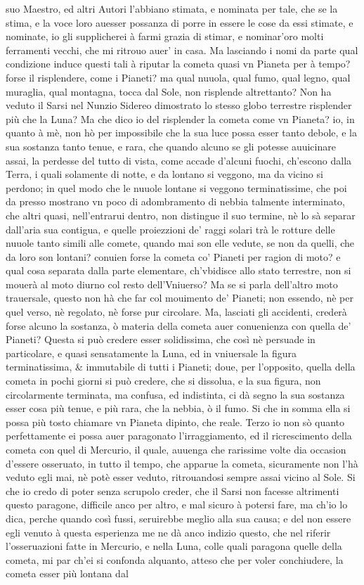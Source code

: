 \documentclass[11pt,twoside,openany]{book}
\begin{document}
suo Maestro, ed altri Autori l'abbiano stimata, e nominata per tale, che se la stima, e la voce loro auesser possanza di porre in essere le cose da essi stimate, e nominate, io gli supplicherei à farmi grazia di stimar, e nominar'oro molti ferramenti vecchi, che mi ritrouo auer' in casa. Ma lasciando i nomi da parte qual condizione induce questi tali à riputar la cometa quasi vn Pianeta per à tempo? forse il risplendere, come i Pianeti? ma qual nuuola, qual fumo, qual legno, qual muraglia, qual montagna, tocca dal Sole, non risplende altrettanto? Non ha veduto il Sarsi nel Nunzio Sidereo dimostrato lo stesso globo terrestre risplender più che la Luna? Ma che dico io del risplender la cometa come vn Pianeta? io, in quanto à mè, non hò per impossibile che la sua luce possa esser tanto debole, e la sua sostanza tanto tenue, e rara, che quando alcuno se gli potesse auuicinare assai, la perdesse del tutto di vista, come accade d'alcuni fuochi, ch'escono dalla Terra, i quali solamente di notte, e da lontano si veggono, ma da vicino si perdono; in quel modo che le nuuole lontane si veggono terminatissime, che poi da presso mostrano vn poco di adombramento di nebbia talmente interminato, che altri quasi, nell'entrarui dentro, non distingue il suo termine, nè lo sà separar dall'aria sua contigua, e quelle proiezzioni de' raggi solari trà le rotture delle nuuole tanto simili alle comete, quando mai son elle vedute, se non da quelli, che da loro son lontani? conuien forse la cometa co' Pianeti per ragion di moto? e qual cosa separata dalla parte elementare, ch'vbidisce allo stato terrestre, non si mouerà al moto diurno col resto dell'Vniuerso? Ma se si parla dell'altro moto trauersale, questo non hà che far col mouimento de' Pianeti; non essendo, nè per quel verso, nè regolato, nè forse pur circolare. Ma, lasciati gli accidenti, crederà forse alcuno la sostanza, ò materia della cometa auer conuenienza con quella de' Pianeti? Questa si può credere esser solidissima, che così nè persuade in particolare, e quasi sensatamente la Luna, ed in vniuersale la figura terminatissima, \& immutabile di tutti i Pianeti; doue, per l'opposito, quella della cometa in pochi giorni si può credere, che si dissolua, e la sua figura, non circolarmente terminata, ma confusa, ed indistinta, ci dà segno la sua sostanza esser cosa più tenue, e più rara, che la nebbia, ò il fumo. Si che in somma ella si possa più tosto chiamare vn Pianeta dipinto, che reale. Terzo io non sò quanto perfettamente ei possa auer paragonato l'irraggiamento, ed il ricrescimento della cometa con quel di Mercurio, il quale, auuenga che rarissime volte dia occasion d'essere osseruato, in tutto il tempo, che apparue la cometa, sicuramente non l'hà veduto egli mai, nè potè esser veduto, ritrouandosi sempre assai vicino al Sole. Si che io credo di poter senza scrupolo creder, che il Sarsi non facesse altrimenti questo paragone, difficile anco per altro, e mal sicuro à potersi fare, ma ch'io lo dica, perche quando così fussi, seruirebbe meglio alla sua causa; e del non essere egli venuto à questa esperienza me ne dà anco indizio questo, che nel riferir l'osseruazioni fatte in Mercurio, e nella Luna, colle quali paragona quelle della cometa, mi par ch'ei si confonda alquanto, atteso che per voler conchiudere, la cometa esser più lontana dal 
\end{document}

